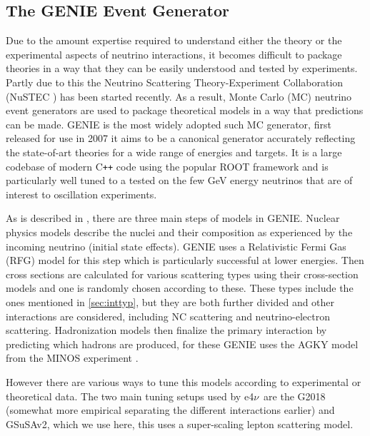 \documentclass[a4paper,12pt]{article}
\newcommand{\efn}{e4$\nu$}
\begin{document}
\subsection{The GENIE Event Generator \cite{andreopoulosGENIENeutrinoMonte2010}}\label{sec:genie}
Due to the amount expertise required to understand either the theory or the experimental aspects of neutrino interactions, it becomes difficult to package theories in a way that they can be easily understood and tested by experiments.
Partly due to this the Neutrino Scattering Theory-Experiment Collaboration (NuSTEC \cite{alvarez-rusoNuSTEC11NeutrinoScattering2018}) has been started recently.
As a result, Monte Carlo (MC) neutrino event generators are used to package theoretical models in a way that predictions can be made.
GENIE is the most widely adopted such MC generator, first released for use in 2007 it aims to be a canonical generator accurately reflecting the state-of-art theories for a wide range of energies and targets.
It is a large codebase of modern C\texttt{++} code using the popular ROOT framework\cite{brunROOTObjectOriented1997} and is particularly well tuned to a tested on the few \si{GeV} energy neutrinos that are of interest to oscillation experiments.

As is described in \cite{andreopoulosGENIENeutrinoMonte2010,andreopoulosGENIENeutrinoMonte2015}, there are three main steps of models in GENIE.
Nuclear physics models describe the nuclei and their composition as experienced by the incoming neutrino (initial state effects).
GENIE uses a Relativistic Fermi Gas (RFG) model for this step which is particularly successful at lower energies.
Then cross sections are calculated for various scattering types using their cross-section models and one is randomly chosen according to these.
These types include the ones mentioned in \cref{sec:inttyp}, but they are both further divided and other interactions are considered, including NC scattering and neutrino-electron scattering.
Hadronization models then finalize the primary interaction by predicting which hadrons are produced, for these GENIE uses the AGKY model from the MINOS experiment \cite{yangHadronizationModelMINOS2007}.

However there are various ways to tune this models according to experimental or theoretical data.
The two main tuning setups used by \efn\ are the G2018 (somewhat more empirical separating the different interactions earlier) and GSuSAv2, which we use here, this uses a super-scaling lepton scattering model\cite{amaroNeutrinonucleusScatteringSuSA2021}.
\end{document}
